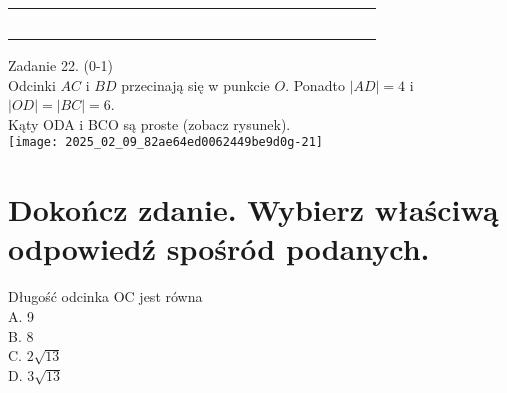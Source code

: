 \documentclass[10pt]{article}
\begin{document}
\begin{center}
\begin{tabular}{|c|c|c|c|c|c|c|c|c|c|c|c|c|c|c|c|c|c|c|c|c|c|c|}
\hline
 &  &  &  &  &  &  &  &  &  &  &  &  &  &  &  &  &  &  &  &  &  &  \\
\hline
 &  &  &  &  &  &  &  &  &  &  &  &  &  &  &  &  &  &  &  &  &  &  \\
\hline
 &  &  &  &  &  &  &  &  &  &  &  &  &  &  &  &  &  &  &  &  &  &  \\
\hline
 &  &  &  &  &  &  &  &  &  &  &  &  &  &  &  &  &  &  &  &  &  &  \\
\hline
 &  &  &  &  &  &  &  &  &  &  &  &  &  &  &  &  &  &  &  &  &  &  \\
\hline
 &  &  &  &  &  &  &  &  &  &  &  &  &  &  &  &  &  &  &  &  &  &  \\
\hline
\end{tabular}
\end{center}

Zadanie 22. (0-1)\\
Odcinki \(A C\) i \(B D\) przecinają się w punkcie \(O\). Ponadto \(|A D|=4\) i \(|O D|=|B C|=6\).\\
Kąty ODA i BCO są proste (zobacz rysunek).\\
\texttt{[image: 2025\_02\_09\_82ae64ed0062449be9d0g-21]}

\section*{Dokończ zdanie. Wybierz właściwą odpowiedź spośród podanych.}
Długość odcinka OC jest równa\\
A. 9\\
B. 8\\
C. \(2 \sqrt{13}\)\\
D. \(3 \sqrt{13}\)
\end{document}
